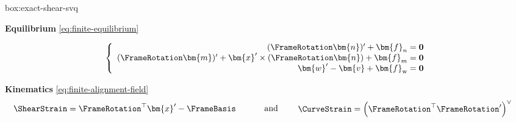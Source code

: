 \begin{ambox}{box:exact-shear-svq}

\textbf{Equilibrium} \eqref{eq:finite-equilibrium}

\begin{equation*} 
\left\{\begin{array}{r}
(\FrameRotation \bm{n})^{\prime}+{\bm{f}}_n=\mathbf{0} \\
(\FrameRotation \bm{m})^{\prime}+\bm{x}^{\prime} \times (\FrameRotation \bm{n}) +{\bm{f}}_m=\mathbf{0} \\
\bm{w}^{\prime}-\bm{v} + \bm{f}_{\rm w} = \mathbf{0}
\end{array}\right. 
\end{equation*}

\textbf{Kinematics} \eqref{eq:finite-alignment-field}
\begin{equation*} 
  \begin{aligned}
    \ShearStrain &= \FrameRotation^{\top}\bm{x}^\prime - \FrameBasis 
  \end{aligned}
  \qquad\text{ and }\qquad
  \begin{aligned}
    \CurveStrain &= 
    \left(\FrameRotation^{\top}\FrameRotation^\prime\right)^{\vee}
  \end{aligned}
\end{equation*}

\end{ambox}


